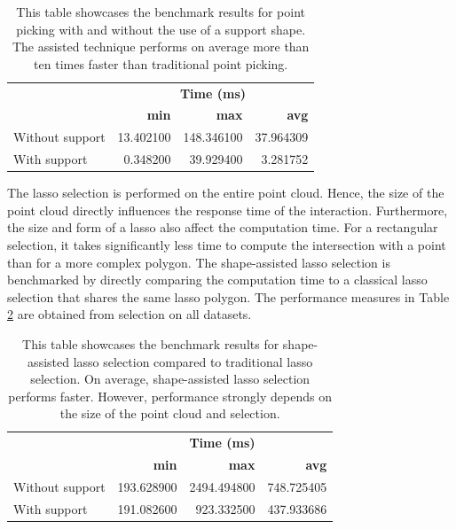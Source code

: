 \begin{table}[b]
\centering
\begin{tabular}{ l|r| r | r }
                       &\multicolumn{3}{c}{\textbf{Time (ms)}}\\
                       & \textbf{min}    & \textbf{max}    & \textbf{avg} \\
        \hline
        Without support& 13.402100  & 148.346100 & 37.964309 \\
        With support   &  0.348200  &  39.929400 &  3.281752 \\

\end{tabular}
\caption{This table showcases the benchmark results for point picking with and without the use of a support shape. The assisted technique performs on average more than ten times faster than traditional point picking. }
\label{tab:picking_performance}
\end{table}

The lasso selection is performed on the entire point cloud. Hence, the size of the point cloud directly influences the response time of the interaction. Furthermore, the size and form of a lasso also affect the computation time. For a rectangular selection, it takes significantly less time to compute the intersection with a point than for a more complex polygon. The shape-assisted lasso selection is benchmarked by directly comparing the computation time to a classical lasso selection that shares the same lasso polygon. The performance measures in Table \ref{tab:lasso_performance} are obtained from selection on all datasets.

\begin{table}
\centering
\begin{tabular}{ l | r | r | r }
                   & \multicolumn{3}{c}{\textbf{Time (ms)}}\\
                   & \textbf{min}    & \textbf{max}    & \textbf{avg} \\
        \hline
Without support    & 193.628900 & 2494.494800 & 748.725405 \\
With support       & 191.082600 & 923.332500 & 437.933686 \\

\end{tabular}
\caption{This table showcases the benchmark results for shape-assisted lasso selection compared to traditional lasso selection. On average, shape-assisted lasso selection performs faster. However, performance strongly depends on the size of the point cloud and selection. }
\label{tab:lasso_performance}
\end{table}


